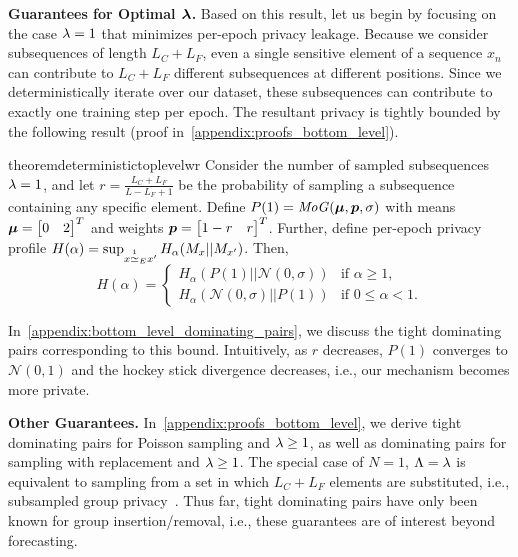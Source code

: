 \textbf{Guarantees for Optimal $\bm{\lambda}$.}
Based on this result, let us begin by focusing on the case $\lambda = 1$ that minimizes per-epoch privacy leakage. 
Because we consider subsequences of length $L_C + L_F$, even a single sensitive element of a sequence $x_n$ can contribute to $L_C + L_F$ different  subsequences at different positions.
Since we deterministically iterate over our dataset, these subsequences can contribute to exactly one training step per epoch.
The resultant privacy is tightly bounded by the following result (proof in~\cref{appendix:proofs_bottom_level}).
\begin{restatable}{theorem}{deterministictoplevelwr}\label{theorem:deterministic_top_level_wr}
    Consider the number of sampled subsequences $\lambda = 1$,
    and let $r = \frac{L_C + L_F}{L - L_F + 1}$ be the probability of sampling a subsequence containing any specific element.
    Define
    $P(1) = \mathit{MoG}({\bm{\mu}}, {\bm{p}}, \sigma)$ with
    means ${\bm{\mu}} = \begin{bmatrix}
        0 & 2
    \end{bmatrix}^T$ and 
    weights ${\bm{p}} = \begin{bmatrix} 1-r & r\end{bmatrix}^T$. Further, define per-epoch privacy profile $H(\alpha) = \sup_{x \overset{1}{\simeq}_{E} x'} H_\alpha(M_x || M_{x'})$. Then, 
    \begin{equation*}
        H(\alpha) = 
        \begin{cases}
            H_\alpha(P(1) || \mathcal{N}(0,\sigma)) & \text{if } \alpha \geq 1,\\
            H_\alpha(\mathcal{N}(0,\sigma) || P(1)) & \text{if } 0 \leq \alpha < 1.
        \end{cases}
    \end{equation*}
\end{restatable}
In~\cref{appendix:bottom_level_dominating_pairs}, we discuss the tight dominating pairs corresponding to this bound.
Intuitively, as $r$ decreases, $P(1)$ converges to $\mathcal{N}(0,1)$ and the hockey stick divergence decreases, i.e., our mechanism becomes more private.

\textbf{Other Guarantees.}
In~\cref{appendix:proofs_bottom_level}, we derive tight dominating pairs for Poisson sampling and $\lambda \geq 1$,
as well as dominating pairs for sampling with replacement and $\lambda \geq 1$.
The special case of $N = 1$, $\Lambda = \lambda$ is equivalent to sampling from a set in which $L_C + L_F$ elements are substituted, i.e., subsampled group privacy~\cite{ganesh2024tight,schuchardt2024unified,jiang2025calibrating}.
Thus far, tight dominating pairs have only been known for group insertion/removal, i.e., 
these guarantees are of interest beyond forecasting.

